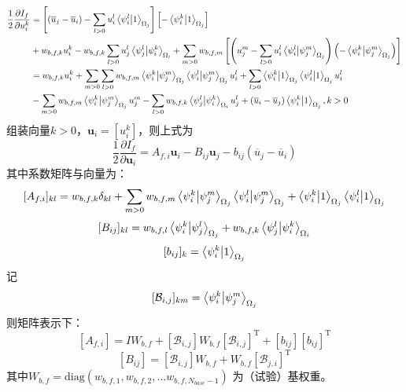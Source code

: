 \documentclass[UTF8,zihao=5]{ctexart} %
\newcommand{\bm}[1]{{\mathbf{#1}}}
\newcommand{\trans}[0]{^\mathrm{T}}
\newcommand*{\pd}[2]{\frac{\partial #1}{\partial #2}}
\newcommand*{\uu}[0]{\bm{u}}
\newcommand*{\mean}[1]{\overline{#1}}
\begin{document}
$$
    \begin{aligned}
        \frac{1}{2}\pd{I_f}{u_i^k}
         & =
        \left[
            (\mean{u}_j - \mean{u}_i)
            - \sum_{l>0}u_i^l\innerproduct{\psi_i^l}{1}_{\Omega_j}
            \right]\left[
            - \innerproduct{\psi_i^k}{1}_{\Omega_j}
            \right]
        \\
         & +
        w_{b,f,k} u_i^k
        - w_{b,f,k}\sum_{l>0}u_j^l\innerproduct{\psi_j^l}{\psi_i^k}_{\Omega_i}
        +
        \sum_{m>0}
        w_{b,f,m}\left[
            {\left(
                    u_j^m
                    - \sum_{l>0}u_i^l\innerproduct{\psi_i^l}{\psi_j^m}_{\Omega_j}
                    \right)\left(
                    - \innerproduct{\psi_i^k}{\psi_j^m}_{\Omega_j}
                    \right)}
        \right]                                                                                   \\
         & =
        w_{b,f,k}u_i^k +
        \sum_{m>0}\sum_{l>0}w_{b,f,m}
        \innerproduct{\psi_i^k}{\psi_j^m}_{\Omega_j}
        \innerproduct{\psi_i^l}{\psi_j^m}_{\Omega_j}u_i^l +
        \sum_{l>0}\innerproduct{\psi_i^k}{1}_{\Omega_j}\innerproduct{\psi_i^l}{1}_{\Omega_j}u_i^l \\
         &
        - \sum_{m>0}w_{b,f,m}\innerproduct{\psi_i^k}{\psi_j^m}_{\Omega_j}u_j^m
        - \sum_{l>0}w_{b,f,k}\innerproduct{\psi_j^l}{\psi_i^k}_{\Omega_i}u_j^l
        + (\mean{u}_i - \mean{u}_j)\innerproduct{\psi_i^k}{1}_{\Omega_j}
        , k>0
    \end{aligned}
$$
组装向量$k>0$，$\uu_i=[u_i^k]$，则上式为
$$
    \frac{1}{2}\pd{I_f}{\uu_i} = A_{f,i} \uu_i - B_{ij} \uu_j -
    b_{ij}(\mean{u}_j - \mean{u}_i )
$$
其中系数矩阵与向量为：
$$
    [A_{f,i}]_{kl} = w_{b,f,k} \delta_{kl} +
    \sum_{m>0}
    w_{b,f,m}
    \innerproduct{\psi_i^k}{\psi_j^m}_{\Omega_j}
    \innerproduct{\psi_i^l}{\psi_j^m}_{\Omega_j}
    +
    \innerproduct{\psi_i^k}{1}_{\Omega_j}
    \innerproduct{\psi_i^l}{1}_{\Omega_j}
$$
$$
    [B_{ij}]_{kl} =
    w_{b,f,l}\innerproduct{\psi_i^k}{\psi_j^l}_{\Omega_j}
    +
    w_{b,f,k}\innerproduct{\psi_j^l}{\psi_i^k}_{\Omega_i}
$$
$$
    [b_{ij}]_{k} =
    \innerproduct{\psi_i^k}{1}_{\Omega_j}
$$
记
$$
    [\mathcal{B}_{i,j}]_{km}=\innerproduct{\psi_i^k}{\psi_j^m}_{\Omega_j}
$$
则矩阵表示下：
$$
    [A_{f,i}] = I W_{b,f} +
    [\mathcal{B}_{i,j}] W_{b,f} [\mathcal{B}_{i,j}]\trans
    +
    [b_{ij}][b_{ij}]\trans
$$
$$
    [B_{ij}] =
    [\mathcal{B}_{i,j}]W_{b,f}
    +
    W_{b,f}[\mathcal{B}_{j,i}]\trans
$$
其中$W_{b,f}=\text{diag}(w_{b,f,1},w_{b,f,2},...w_{b,f,N_{base}-1})$
为（试验）基权重。
\end{document}
